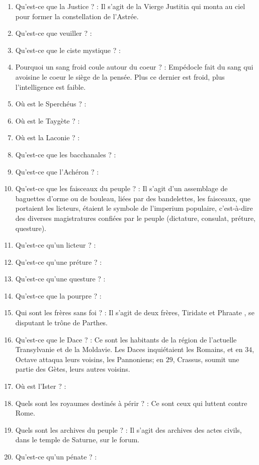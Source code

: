 \documentclass[a4paper, 11pt, hidelinks]{article}
\begin{document}
\begin{enumerate}
      \item Qu'est-ce que la Justice ? : Il s'agit de la Vierge Justitia qui monta au ciel pour former la constellation de l'Astrée.
      \item Qu'est-ce que veuiller ? :
      \item Qu'est-ce que le ciste mystique ? :
      \item Pourquoi un sang froid coule autour du coeur ? : Empédocle fait du sang qui avoisine le coeur le siège de la pensée.
            Plus ce dernier est froid, plus l'intelligence est faible.
      \item Où est le Sperchéus ? :
      \item Où est le Taygète ? :
      \item Où est la Laconie ? :
      \item Qu'est-ce que les bacchanales ? :
      \item Qu'est-ce que l'Achéron ? :
      \item Qu'est-ce que les faisceaux du peuple ? : Il s'agit d'un assemblage de baguettes d'orme ou de bouleau, liées par des bandelettes,
            les faisceaux, que portaient les licteurs, étaient le symbole de l'imperium populaire, c'est-à-dire des diverses magistratures
            confiées par le peuple (dictature, consulat, préture, questure).
      \item Qu'est-ce qu'un licteur ? :
      \item Qu'est-ce qu'une préture ? :
      \item Qu'est-ce qu'une questure ? :
      \item Qu'est-ce que la pourpre ? :
      \item Qui sont les frères sans foi ? : Il s'agit de deux frères, Tiridate et Phraate , se disputant le trône de Parthes.
      \item Qu'est-ce que le Dace ? : Ce sont les habitants de la région de l'actuelle Transylvanie et de la Moldavie. Les Daces
            inquiétaient les Romains, et en $34$, Octave attaqua leurs voisins, les Pannoniens; en $29$, Crassus, soumit une partie
            des Gètes, leurs autres voisins.
      \item Où est l'Ister ? :
      \item Quels sont les royaumes destinés à périr ? : Ce sont ceux qui luttent contre Rome.
      \item Quels sont les archives du peuple ? : Il s'agit des archives des actes civils, dans le temple de Saturne, sur le forum.
      \item Qu'est-ce qu'un pénate ? :

\end{enumerate}
\end{document}
